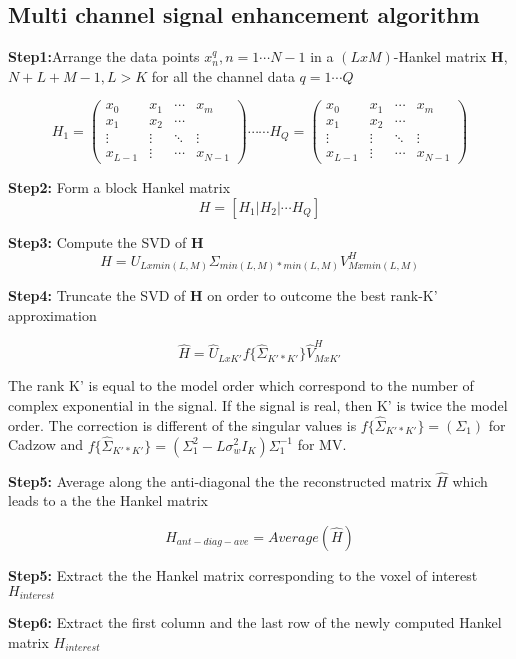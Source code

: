 \subsection{Multi channel signal enhancement algorithm}\label{Ap31}  


\textbf{Step1:}Arrange the data points $x^{q}_{n},n=1\cdots N-1$ in a $(LxM)$-Hankel matrix \textbf{H}, $N+L+M-1,L>K$ for all the channel data $q=1\cdots Q$ 

\begin{equation}
H_{1}= 
 \begin{pmatrix}
  x_{0} & x_{1} & \cdots & x_{m} \\
  x_{1} & x_{2} & \cdots &   \\
  \vdots  & \vdots  & \ddots & \vdots  \\
  x_{L-1} & \vdots & \cdots & x_{N-1} 
 \end{pmatrix}\cdots \cdots 
 H_{Q}= 
 \begin{pmatrix}
  x_{0} & x_{1} & \cdots & x_{m} \\
  x_{1} & x_{2} & \cdots &   \\
  \vdots  & \vdots  & \ddots & \vdots  \\
  x_{L-1} & \vdots & \cdots & x_{N-1} 
 \end{pmatrix}
\end{equation}

 \textbf{Step2:} Form a block Hankel matrix
 \begin{equation}
 H=[H_{1}|H_{2}|\cdots H_{Q}]
 \end{equation}
 
 \textbf{Step3:} Compute the SVD of \textbf{H}
 \begin{equation}
 H=U_{Lxmin(L,M)}\Sigma_{min(L,M)*min(L,M)}V^{H}_{Mxmin(L,M)}
 \end{equation}
 
 \textbf{Step4:} Truncate the SVD of \textbf{H} on order to outcome the best rank-K' approximation 
 
 \begin{equation}
 \hat{H}=\hat{U}_{LxK'}f\big\{\hat{\Sigma}_{K'*K'}\big\}\hat{V}^{H}_{MxK'}
 \end{equation}
 
 The rank K' is equal to the model order which correspond to the number of complex exponential in the signal. If the signal is real, then K' is twice the model order. The correction is different of the singular values is $f\big\{\hat{\Sigma}_{K'*K'}\big\}=(\Sigma_{1})$  for Cadzow and $f\big\{\hat{\Sigma}_{K'*K'}\big\}=(\Sigma^{2}_{1}-L\sigma^{2}_{w}I_{K})\Sigma_{1}^{-1}$ for MV.
 
 
\textbf{Step5:} Average along the anti-diagonal the the reconstructed matrix $\hat{H}$ which leads to a the the Hankel matrix

\begin{equation}
\hat{H}_{ant-diag-ave}=Average(\hat{H})
\end{equation}



 \textbf{Step5:} Extract  the the Hankel matrix corresponding to the voxel of interest $H_{interest}$
 
\textbf{Step6:} Extract the first column and the last row of the newly computed Hankel matrix $H_{interest}$